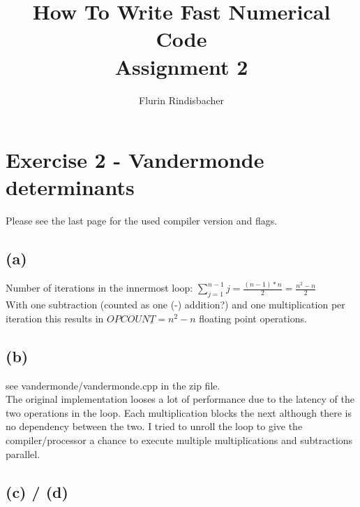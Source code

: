 \documentclass[10pt,a4paper,oneside,notitlepage]{report}
\author{Flurin Rindisbacher}
\title{How To Write Fast Numerical Code \\ \vspace{6 mm} \textbf{Assignment 2}}
\begin{document}
\maketitle

\section*{Exercise 2 - Vandermonde determinants}

Please see the last page for the used compiler version and flags.

\subsection*{(a)}
Number of iterations in the innermost loop: $\sum\limits_{j=1}^{n-1} j = \frac{(n-1)*n}{2} = \frac{n^2 -n}{2}$ \\
With one subtraction (counted as one (-) addition?) and one multiplication per iteration this results in $\underline{OPCOUNT = n^2-n}$ floating point operations.  

\subsection*{(b)}
see vandermonde/vandermonde.cpp in the zip file. \\
The original implementation looses a lot of performance due to the latency of the two operations in the loop. Each multiplication blocks the next although there is no dependency between the two. I tried to unroll the loop to give the compiler/processor a chance to execute multiple multiplications and subtractions parallel.

\subsection*{(c) / (d)}	
\end{document}
